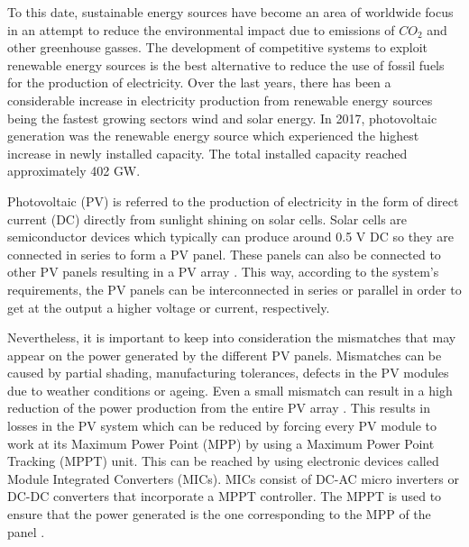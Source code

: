 To this date, sustainable energy sources have become an area of worldwide focus in an attempt to reduce the environmental impact due to emissions of $CO_{2}$ and other greenhouse gasses. The development of competitive systems to exploit renewable energy sources is the best alternative to reduce the use of fossil fuels for the production of electricity. Over the last years, there has been a considerable increase in electricity production from renewable energy sources being the fastest growing sectors wind and solar energy. In 2017, photovoltaic generation was the renewable energy source which experienced the highest increase in newly installed capacity. The total installed capacity reached approximately 402 GW\cite{global}. 

Photovoltaic (PV) is referred to the production of electricity in the form of direct current (DC) directly from sunlight shining on solar cells. Solar cells are semiconductor devices which typically can produce around 0.5 V DC so they are connected in series to form a PV panel. These panels can also be connected to other PV panels resulting in a PV array \cite{handbook}. This way, according to the system's requirements, the PV panels can be interconnected in series or parallel in order to get at the output a higher voltage or current, respectively.

Nevertheless, it is important to keep into consideration the mismatches that may appear on the power generated by the different PV panels.  Mismatches can be caused by partial shading, manufacturing tolerances, defects in the PV modules due to weather conditions or ageing. Even a small mismatch can result in a high reduction of the power production from the entire PV array \cite{MPPmismatch}. This results in losses in the PV system which can be reduced by forcing every PV module to work at its Maximum Power Point (MPP) by using a Maximum Power Point Tracking (MPPT) unit. This can be reached by using electronic devices called Module Integrated Converters (MICs). MICs consist of DC-AC micro inverters or DC-DC converters that incorporate a MPPT controller. The MPPT is used to ensure that the power generated is the one corresponding to the MPP of the panel \cite{MPPmismatch}.

\newpage
